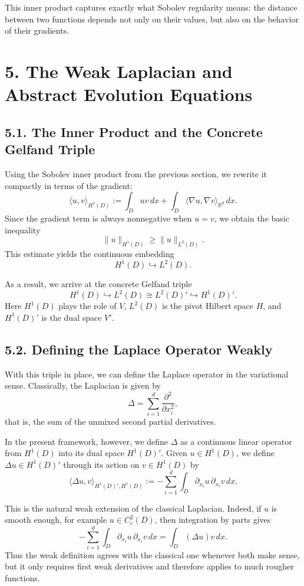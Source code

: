 \documentclass[11pt]{article}
\theoremstyle{definition}
\theoremstyle{remark}
\begin{document}
This inner product captures exactly what Sobolev regularity means: the distance between two functions depends not only on their values, but also on the behavior of their gradients.

\section*{5. The Weak Laplacian and Abstract Evolution Equations}

\subsection*{5.1. The Inner Product and the Concrete Gelfand Triple}
Using the Sobolev inner product from the previous section, we rewrite it compactly in terms of the gradient:
\[
\langle u,v\rangle_{H^1(D)}
:=
\int_D uv\,dx+\int_D \langle \nabla u,\nabla v\rangle_{\mathbb R^d}\,dx.
\]
Since the gradient term is always nonnegative when \(u=v\), we obtain the basic inequality
\[
\|u\|_{H^1(D)}\ge \|u\|_{L^2(D)}.
\]
This estimate yields the continuous embedding
\[
H^1(D)\hookrightarrow L^2(D).
\]

As a result, we arrive at the concrete Gelfand triple
\[
H^1(D)\hookrightarrow L^2(D)\cong L^2(D)'\hookrightarrow H^1(D)'.
\]
Here \(H^1(D)\) plays the role of \(V\), \(L^2(D)\) is the pivot Hilbert space \(H\), and \(H^1(D)'\) is the dual space \(V'\).

\subsection*{5.2. Defining the Laplace Operator Weakly}
With this triple in place, we can define the Laplace operator in the variational sense. Classically, the Laplacian is given by
\[
\Delta=\sum_{i=1}^d \frac{\partial^2}{\partial x_i^2},
\]
that is, the sum of the unmixed second partial derivatives.

In the present framework, however, we define \(\Delta\) as a continuous linear operator from \(H^1(D)\) into its dual space \(H^1(D)'\). Given \(u\in H^1(D)\), we define \(\Delta u\in H^1(D)'\) through its action on \(v\in H^1(D)\) by
\[
\langle \Delta u,v\rangle_{H^1(D)',H^1(D)}
:=
-\sum_{i=1}^d \int_D \partial_{x_i}u\,\partial_{x_i}v\,dx.
\]

This is the natural weak extension of the classical Laplacian. Indeed, if \(u\) is smooth enough, for example \(u\in C_c^2(D)\), then integration by parts gives
\[
-\sum_{i=1}^d \int_D \partial_{x_i}u\,\partial_{x_i}v\,dx
=
\int_D (\Delta u)v\,dx.
\]
Thus the weak definition agrees with the classical one whenever both make sense, but it only requires first weak derivatives and therefore applies to much rougher functions.
\end{document}
